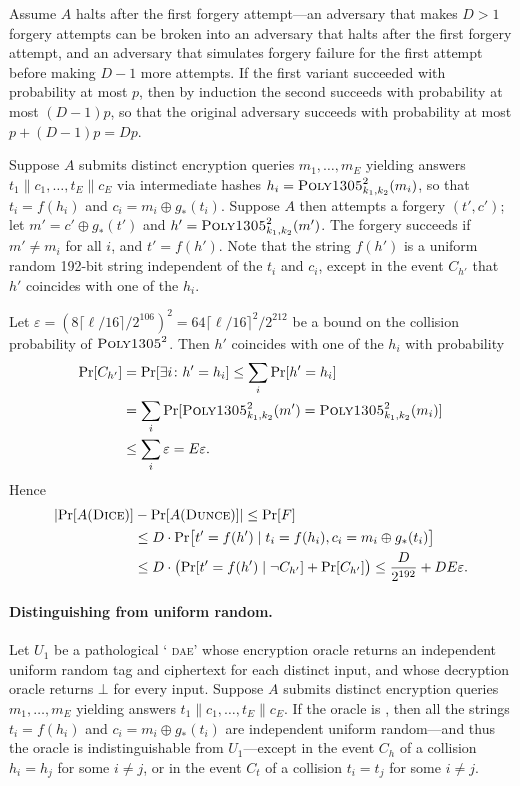 \documentclass{article}
\def\operatorsc#1{{%
  \ifmmode\let\next=\operatorname\else\let\next=\relax\fi\next{\textsc{#1}}}}
\def\Poly#1/{\operatorsc{Poly#1}}
\def\DUNCE/{\operatorsc{Dunce}}
\def\DICE/{\operatorsc{Dice}}
\def\DAE{%
  \ifmmode\def\next{\operatorname{DAE}}%
    \else\def\next/{\textsc{dae}}%
  \fi\next}
\newcommand{\concat}{\mathbin\|}
\newcommand{\given}{\mathrel|}
\newcommand{\collisionbound}{\varepsilon}
\begin{document}
Assume $A$ halts after the first forgery attempt---an adversary that
 makes $D>1$ forgery attempts can be broken into an adversary that
 halts after the first forgery attempt, and an adversary that
 simulates forgery failure for the first attempt before making $D-1$
 more attempts.
If the first variant succeeded with probability at most $p$, then by
 induction the second succeeds with probability at most $(D - 1) p$,
 so that the original adversary succeeds with probability at most
 $p + (D - 1) p = D p$.

Suppose $A$ submits distinct encryption queries
 $m_1, \dotsc, m_E$
 yielding answers
 $t_1 \concat c_1, \dotsc, t_E \concat c_E$
 via intermediate hashes
 $h_i = \Poly1305/^2_{k_1,k_2}(m_i)$,
 so that $t_i = f(h_i)$ and $c_i = m_i \oplus g_*(t_i)$.
Suppose $A$ then attempts a forgery $(t', c')$; let
 $m' = c' \oplus g_*(t')$
 and
 $h' = \Poly1305/^2_{k_1,k_2}(m')$.
The forgery succeeds if $m' \ne m_i$ for all $i$, and $t' = f(h')$.
Note that the string $f(h')$ is a uniform random 192-bit string
 independent of the $t_i$ and $c_i$, except in the event $C_{h'}$ that
 $h'$ coincides with one of the $h_i$.

Let
 $\collisionbound = (8\lceil\ell/16\rceil/2^{106})^2
   = 64\lceil\ell/16\rceil^2\!/2^{212}$
 be a bound on the collision probability of $\Poly1305/^2$.
Then $h'$ coincides with one of the $h_i$ with probability
%
\begin{align*}
  \Pr[C_{h'}]
  &= \Pr[\exists i\colon h' = h_i]
   \leq \sum_i \Pr[h' = h_i] \\
  &= \sum_i \Pr[\Poly1305/^2_{k_1,k_2}(m') = \Poly1305/^2_{k_1,k_2}(m_i)] \\
  &\leq \sum_i \collisionbound
   = E \collisionbound.
\end{align*}
%
Hence
%
\begin{align*}
  \lvert\Pr[A(\DICE/)] &- \Pr[A(\DUNCE/)]\rvert
   \leq \Pr[F] \\
  &\leq D \cdot \Pr\bigl[t' = f(h')
            \given t_i = f(h_i), c_i = m_i \oplus g_*(t_i)\bigr] \\
  &\leq D \cdot \bigl(\Pr[t' = f(h') \given \lnot C_{h'}]
                      + \Pr[C_{h'}]\bigr)
   \leq \frac{D}{2^{192}} + D E \collisionbound.
\end{align*}

\paragraph*{Distinguishing \DUNCE/ from uniform random.}
Let $U_1$ be a pathological `\DAE/' whose encryption oracle returns an
 independent uniform random tag and ciphertext for each distinct
 input, and whose decryption oracle returns $\bot$ for every input.
Suppose $A$ submits distinct encryption queries
 $m_1, \dotsc, m_E$
 yielding answers
 $t_1 \concat c_1, \dotsc, t_E \concat c_E$.
If the oracle is \DUNCE/, then all the strings $t_i = f(h_i)$ and
 $c_i = m_i \oplus g_*(t_i)$ are independent uniform random---and thus
 the oracle is indistinguishable from $U_1$---except in the event
 $C_h$ of a collision $h_i = h_j$ for some $i \ne j$, or in the event
 $C_t$ of a collision $t_i = t_j$ for some $i \ne j$.
\end{document}
